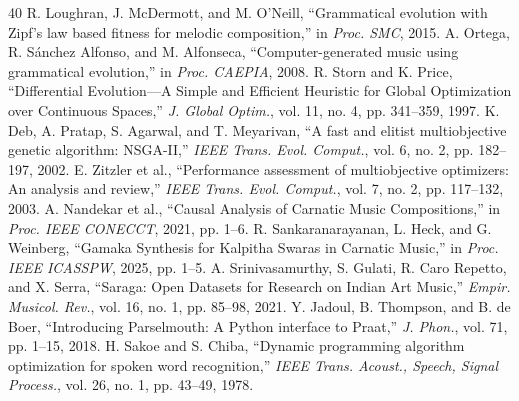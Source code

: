 \documentclass[conference,letterpaper]{IEEEtran}
\newcounter{algorithm}
\begin{document}
\begin{thebibliography}{40}
 R. Loughran, J. McDermott, and M. O'Neill, ``Grammatical evolution with Zipf's law based fitness for melodic composition,'' in \emph{Proc. SMC}, 2015.
 A. Ortega, R. S{\'a}nchez Alfonso, and M. Alfonseca, ``Computer-generated music using grammatical evolution,'' in \emph{Proc. CAEPIA}, 2008.
 R. Storn and K. Price, ``Differential Evolution---A Simple and Efficient Heuristic for Global Optimization over Continuous Spaces,'' \emph{J. Global Optim.}, vol. 11, no. 4, pp. 341--359, 1997.
 K. Deb, A. Pratap, S. Agarwal, and T. Meyarivan, ``A fast and elitist multiobjective genetic algorithm: NSGA-II,'' \emph{IEEE Trans. Evol. Comput.}, vol. 6, no. 2, pp. 182--197, 2002.
 E. Zitzler et al., ``Performance assessment of multiobjective optimizers: An analysis and review,'' \emph{IEEE Trans. Evol. Comput.}, vol. 7, no. 2, pp. 117--132, 2003.
 A. Nandekar et al., ``Causal Analysis of Carnatic Music Compositions,'' in \emph{Proc. IEEE CONECCT}, 2021, pp. 1--6.
 R. Sankaranarayanan, L. Heck, and G. Weinberg, ``Gamaka Synthesis for Kalpitha Swaras in Carnatic Music,'' in \emph{Proc. IEEE ICASSPW}, 2025, pp. 1--5.
 A. Srinivasamurthy, S. Gulati, R. Caro Repetto, and X. Serra, ``Saraga: Open Datasets for Research on Indian Art Music,'' \emph{Empir. Musicol. Rev.}, vol. 16, no. 1, pp. 85--98, 2021.
 Y. Jadoul, B. Thompson, and B. de Boer, ``Introducing Parselmouth: A Python interface to Praat,'' \emph{J. Phon.}, vol. 71, pp. 1--15, 2018.
 H. Sakoe and S. Chiba, ``Dynamic programming algorithm optimization for spoken word recognition,'' \emph{IEEE Trans. Acoust., Speech, Signal Process.}, vol. 26, no. 1, pp. 43--49, 1978.
\end{thebibliography}
\end{document}
